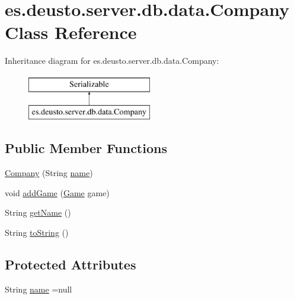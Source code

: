 \hypertarget{classes_1_1deusto_1_1server_1_1db_1_1data_1_1_company}{}\section{es.\+deusto.\+server.\+db.\+data.\+Company Class Reference}
\label{classes_1_1deusto_1_1server_1_1db_1_1data_1_1_company}
Inheritance diagram for es.\+deusto.\+server.\+db.\+data.\+Company\+:\begin{figure}[H]
\begin{center}
\leavevmode
\includegraphics[height=2.000000cm]{classes_1_1deusto_1_1server_1_1db_1_1data_1_1_company}
\end{center}
\end{figure}
\subsection*{Public Member Functions}
\begin{DoxyCompactItemize}
\item 
\hyperlink{classes_1_1deusto_1_1server_1_1db_1_1data_1_1_company_acdee89103d4e157b7d4016fd8cd26d5e}{Company} (String \hyperlink{classes_1_1deusto_1_1server_1_1db_1_1data_1_1_company_a3080458c34b5cf83c7f8e866a93e60ac}{name})
\item 
void \hyperlink{classes_1_1deusto_1_1server_1_1db_1_1data_1_1_company_a99f3f91509e0a1ff5fc4d4d6a6219e77}{add\+Game} (\hyperlink{classes_1_1deusto_1_1server_1_1db_1_1data_1_1_game}{Game} game)
\item 
String \hyperlink{classes_1_1deusto_1_1server_1_1db_1_1data_1_1_company_a3bf0781fd4ec441406a5f8a05f293a23}{get\+Name} ()
\item 
String \hyperlink{classes_1_1deusto_1_1server_1_1db_1_1data_1_1_company_a3896b4f463ebed4f07fd3d9d0639b75a}{to\+String} ()
\end{DoxyCompactItemize}
\subsection*{Protected Attributes}
\begin{DoxyCompactItemize}
\item 
String \hyperlink{classes_1_1deusto_1_1server_1_1db_1_1data_1_1_company_a3080458c34b5cf83c7f8e866a93e60ac}{name} =null
\end{DoxyCompactItemize}


